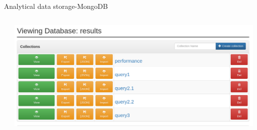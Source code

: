 \documentclass[13pt,aspectratio=169,t,xcolor=table]{beamer}
\begin{document}
\begin{frame}{Analytical data storage-MongoDB}
\begin{columns}
\begin{minipage}[b]{1\textwidth}
\begin{itemize}
                \end{itemize}
            \end{minipage}
            \begin{minipage}{1\textwidth}
                \begin{adjustbox}{margin=0cm 0cm 1.5cm 0cm, center}
                    \includegraphics[width=1\textwidth]{res/mongo.png}
                \end{adjustbox}
            \end{minipage}
    \end{columns}
\end{frame}

\end{document}
